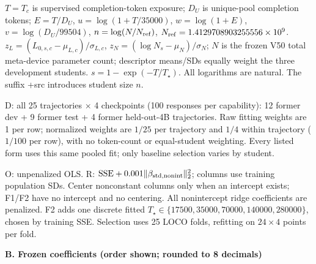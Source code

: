 \begin{table}[H]
\begin{minipage}{\textwidth}
$T=T_c$ is supervised completion-token exposure; $D_U$ is unique-pool completion tokens; $E=T/D_U$, $u=\log(1+T/35000)$, $w=\log(1+E)$, $v=\log(D_U/99504)$, $n=\log(N/N_{\rm ref})$, $N_{\rm ref}=1.4129708903255556\times10^9$. $z_L=(L_{0,s,c}-\mu_{L,c})/\sigma_{L,c}$, $z_N=(\log N_s-\mu_N)/\sigma_N$; $N$ is the frozen V50 total meta-device parameter count; descriptor means/SDs equally weight the three development students. $s=1-\exp(-T/T_\star)$. All logarithms are natural. The suffix +src introduces student size $n$.
\par D: all 25 trajectories $\times$ 4 checkpoints (100 responses per capability): 12 former dev + 9 former test + 4 former held-out-4B trajectories. Raw fitting weights are 1 per row; normalized weights are $1/25$ per trajectory and $1/4$ within trajectory ($1/100$ per row), with no token-count or equal-student weighting. Every listed form uses this same pooled fit; only baseline selection varies by student.
\par O: unpenalized OLS. R: $\mathrm{SSE}+0.001\|\beta_{\rm std,nonint}\|_2^2$; columns use training population SDs. Center nonconstant columns only when an intercept exists; F1/F2 have no intercept and no centering. All nonintercept ridge coefficients are penalized. F2 adds one discrete fitted $T_\star\in\{17500,35000,70000,140000,280000\}$, chosen by training SSE. Selection uses 25 LOCO folds, refitting on $24\times4$ points per fold.
\end{minipage}
\par\smallskip
\textbf{B. Frozen coefficients (order shown; rounded to 8 decimals)}\par\smallskip
{}
\end{table}
